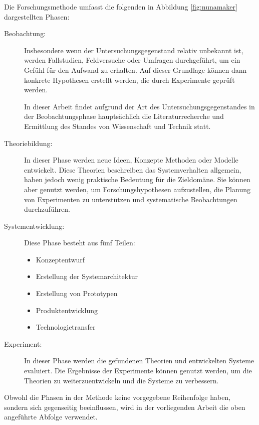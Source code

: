 Die Forschungsmethode umfasst die folgenden in Abbildung \ref{fig:nunamaker} dargestellten Phasen:
\begin{description}
\item[Beobachtung:] Insbesondere wenn der Untersuchungsgegenstand relativ unbekannt ist, werden Fallstudien, Feldversuche oder Umfragen durchgeführt, um ein \glqq Gefühl\grqq{} für den Aufwand zu erhalten. Auf dieser Grundlage können dann konkrete Hypothesen erstellt werden, die durch Experimente geprüft werden. 

In dieser Arbeit findet aufgrund der Art des Untersuchungsgegenstandes in der Beobachtungsphase hauptsächlich die Literaturrecherche und Ermittlung des Standes von Wissenschaft und Technik statt.

\item[Theoriebildung:] In dieser Phase werden neue Ideen, Konzepte Methoden oder Modelle entwickelt. Diese Theorien beschreiben das Systemverhalten allgemein, haben jedoch wenig praktische Bedeutung für die Zieldomäne. Sie können aber genutzt werden, um Forschungshypothesen aufzustellen, die Planung von Experimenten zu unterstützen und systematische Beobachtungen durchzuführen.

\item[Systementwicklung:] Diese Phase besteht aus fünf Teilen:
\begin{itemize}
\item Konzeptentwurf

\item Erstellung der Systemarchitektur

\item Erstellung von Prototypen

\item Produktentwicklung

\item Technologietransfer
\end{itemize}


\item[Experiment:] In dieser Phase werden die gefundenen Theorien und entwickelten Systeme evaluiert. Die Ergebnisse der Experimente können genutzt werden, um die Theorien zu weiterzuentwickeln und die Systeme zu verbessern.

\end{description}

Obwohl die Phasen in der Methode keine vorgegebene Reihenfolge haben, sondern sich gegenseitig beeinflussen, wird in der vorliegenden Arbeit die oben angeführte Abfolge verwendet.


